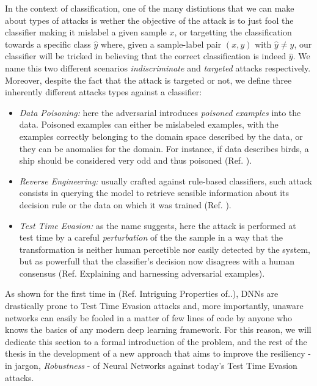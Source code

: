 \documentclass[LaM,binding=0.6cm]{./packages/sapthesis/sapthesis}
\begin{document}
    In the context of classification, one of the many distintions that we can make about types of attacks is wether the objective of the attack is to just fool the classifier making it mislabel 
    a given sample $ x $, or targetting the classification towards a specific class $ \hat{y} $ where, given a sample-label pair $ (x, y) $ with $ \hat{y} \neq  y $, our classifier will be tricked in
    believing that the correct classification is indeed $ \hat{y} $. We name this two different scenarios \textit{indiscriminate} and \textit{targeted} attacks respectively. Moreover, despite the fact that the attack is targeted 
    or not, we define three inherently different attacks types against a classifier:
    \begin{itemize}
        \item \textit{Data Poisoning:}
        here the adversarial introduces \textit{poisoned examples} into the data. Poisoned examples can either be mislabeled examples, with the examples correctly belonging to the domain space described
        by the data, or they can be anomalies for the domain. For instance, if data describes birds, a ship should be considered very odd and thus poisoned (Ref. ).
        \item \textit{Reverse Engineering:}
        usually crafted against rule-based classifiers, such attack consists in querying the model to retrieve sensible information about its decision rule or the data on which it was trained (Ref. ).
        \item \textit{Test Time Evasion:}
        as the name suggests, here the attack is performed at test time by a careful \textit{perturbation} of the the sample in a way that the transformation is neither human percetible nor
        easily detected by the system, but as powerfull that the classifier's decision now disagrees with a human consensus (Ref. Explaining and harnessing adversarial examples).
    \end{itemize}
    As shown for the first time in (Ref. Intriguing Properties of..), DNNs are drastically prone to Test Time Evasion attacks and, more importantly, unaware networks can easily be fooled in a matter of
    few lines of code by anyone who knows the basics of any modern deep learning framework. For this reason, we will dedicate this section to a formal introduction of the problem, and the rest of 
    the thesis in the development of a new approach that aims to improve the resiliency - in jargon, \textit{Robustness} - of Neural Networks against today's Test Time Evasion attacks. 
\end{document}
